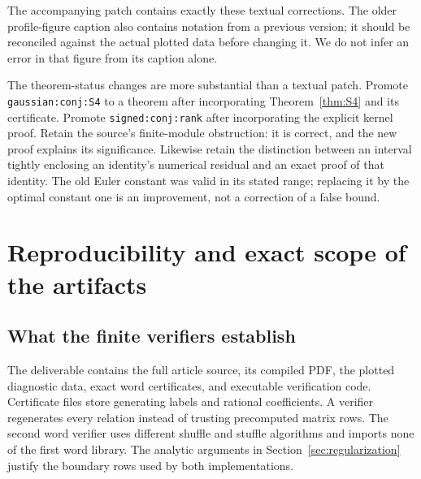 \documentclass[11pt]{article}
\numberwithin{equation}{section}
\theoremstyle{plain}
\theoremstyle{definition}
\theoremstyle{remark}
\begin{document}
The accompanying patch contains exactly these textual corrections.
The older profile-figure caption also contains notation from a previous
version; it should be reconciled against the actual plotted data before
changing it. We do not infer an error in that figure from its caption
alone.

The theorem-status changes are more substantial than a textual patch.
Promote \nolinkurl{gaussian:conj:S4} to a theorem after incorporating
Theorem~\ref{thm:S4} and its certificate. Promote
\nolinkurl{signed:conj:rank} after incorporating the explicit kernel proof.
Retain the source's finite-module obstruction: it is correct, and the
new proof explains its significance. Likewise retain the distinction
between an interval tightly enclosing an identity's numerical residual
and an exact proof of that identity. The old Euler constant was valid
in its stated range; replacing it by the optimal constant one is an
improvement, not a correction of a false bound.

\section{Reproducibility and exact scope of the artifacts}
\label{sec:reproducibility}

\subsection{What the finite verifiers establish}

The deliverable contains the full article source, its compiled PDF,
the plotted diagnostic data, exact word certificates, and executable
verification code. Certificate files store generating labels and
rational coefficients. A verifier regenerates every relation instead
of trusting precomputed matrix rows. The second word verifier uses
different shuffle and stuffle algorithms and imports none of the first
word library. The analytic arguments in Section~\ref{sec:regularization}
justify the boundary rows used by both implementations.
\end{document}
